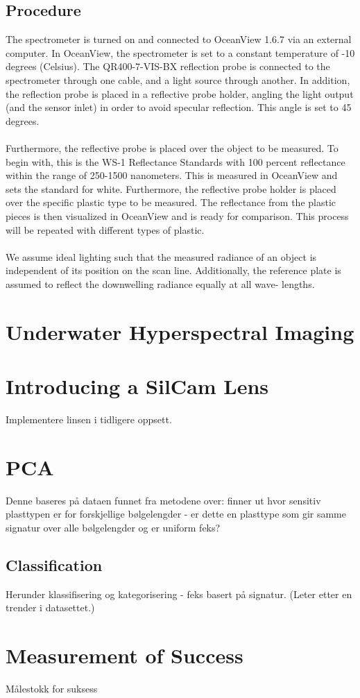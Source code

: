 \subsection{Procedure} 
The spectrometer is turned on and connected to OceanView 1.6.7 via an external computer. In OceanView, the spectrometer is set to a constant temperature of -10 degrees (Celsius). The QR400-7-VIS-BX reflection probe is connected to the spectrometer through one cable, and a light source through another. In addition, the reflection probe is placed in a reflective probe holder, angling the light output (and the sensor inlet) in order to avoid specular reflection. This angle is set to 45 degrees.
\\\\
Furthermore, the reflective probe is placed over the object to be measured. To begin with, this is the WS-1 Reflectance Standards with 100 percent reflectance within the range of 250-1500 nanometers. This is measured in OceanView and sets the standard for white. Furthermore, the reflective probe holder is placed over the specific plastic type to be measured. The reflectance from the plastic pieces is then visualized in OceanView and is ready for comparison. This process will be repeated with different types of plastic.
\\\\
We assume ideal lighting such that the measured radiance of an object is independent of its position on the scan line. Additionally, the reference plate is assumed to reflect the downwelling radiance equally at all wave- lengths. 



\section{Underwater Hyperspectral Imaging} 

\section{Introducing a SilCam Lens} Implementere linsen i tidligere oppsett. 

\section{PCA} Denne baseres på dataen funnet fra metodene over: finner ut hvor sensitiv plasttypen er for forskjellige bølgelengder - er dette en plasttype som gir samme signatur over alle bølgelengder og er uniform feks?

\subsection{Classification} Herunder klassifisering og kategorisering - feks basert på signatur. (Leter etter en trender i datasettet.)

\section{Measurement of Success}
Målestokk for suksess